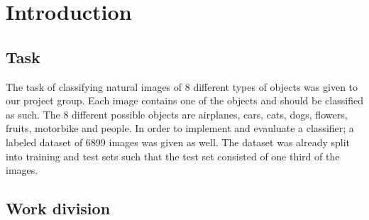 \documentclass[doc/report.tex]{subfiles}
\begin{document}
\section{Introduction}

\subsection{Task}
The task of classifying natural images of 8 different types of objects was given
to our project group. Each image contains one of the objects and should be
classified as such. The 8 different possible objects are airplanes, cars, cats,
dogs, flowers, fruits, motorbike and people. In order to implement and
evauluate a classifier; a labeled dataset of 6899 images was given as well. The
dataset was already split into training and test sets such that the test set
consisted of one third of the images.

\subsection{Work division}
    
\end{document}

